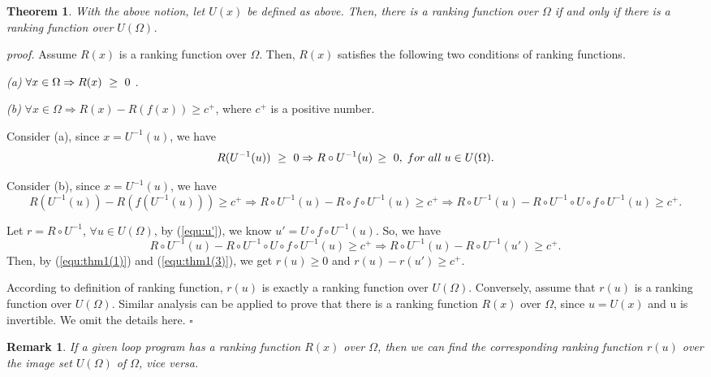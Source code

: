 \newtheorem{mythm}{Theorem}
\begin{mythm}\label{thm1}
	With the above notion, let $U(x)$ be defined as above. Then, there is a ranking function over $\Omega $ if and only if there is a ranking function over $U(\Omega )$.
\end{mythm}
\emph{proof.}
Assume $R(x)$ is a ranking function over $\Omega $. Then, $R(x)$ satisfies the following two conditions of ranking functions.

\emph{(a)} $\forall x \in \Omega  \Rightarrow R(x)\,\, \ge \,\,{\rm{0}}$ . 

\emph{(b)} $\forall x \in \Omega  \Rightarrow R(x) - R(f(x)) \ge c^+$, where $c^+$ is a positive number. 

Consider (a), since  $x = {U^{ - 1}}(u)$, we have 
\begin{equation}\label{equ:thm1(1)}
R({U^{ - 1}}(u))\,\, \ge \,\,{\rm{0}} \Rightarrow  R \circ {U^{ - 1}}(u)\, \ge \,\,{\rm{0}}, \;for\;all\;u \in U(\Omega).
\end{equation}

Consider (b), since $x=U^{-1}(u)$, we have 
\begin{equation}\label{equ:thm1(2)}
R({U^{ - 1}}(u)) - R(f({U^{ - 1}}(u))) \ge c^+ \Rightarrow R \circ {U^{ - 1}}(u) - R \circ f \circ {U^{ - 1}}(u) \ge c^+ \Rightarrow R \circ {U^{ - 1}}(u) - R \circ U^{-1} \circ U \circ f \circ {U^{ - 1}}(u) \ge c^+.
\end{equation}

Let $r = R \circ {U^{ - 1}}$, $\forall u \in U(\Omega )$, by (\ref{equ:u'}), we know $u'=U \circ f \circ {U^{ - 1}}(u)$. So, we have 
\begin{equation}\label{equ:thm1(3)}
R \circ {U^{ - 1}}(u) - R \circ U^{-1} \circ U \circ f \circ {U^{ - 1}}(u) \ge c^+ \Rightarrow R \circ {U^{ - 1}}(u) - R \circ U^{-1} (u') \ge c^+.
\end{equation}
Then, by (\ref{equ:thm1(1)}) and (\ref{equ:thm1(3)}), we get $r(u) \ge 0$ and $r(u)-r(u') \ge c^+$.

According to definition of ranking function, $r(u)$ is exactly a ranking function over $U(\Omega )$. Conversely, assume that $r(u)$ is a ranking function over $U(\Omega)$. Similar analysis can be applied to prove that there is a ranking function $R(x)$ over $\Omega$, since $u=U(x)$ and u is invertible. We omit the details here. $\square$

\newtheorem{rem}{Remark}
\begin{rem}
	If a given loop program has a ranking function $R(x)$ over $\Omega $, then we can find the corresponding ranking function $r(u)$ over the image set $U(\Omega )$ of $\Omega $, vice versa.
\end{rem}

